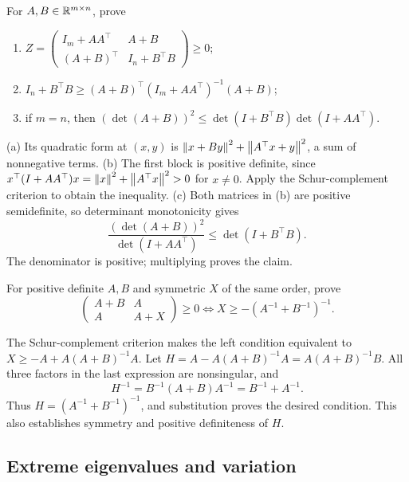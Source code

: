 \begin{problem}\label{ex:12:ineq-ma-37}
For \(A,B\in\mathbb R^{m\times n}\), prove
\begin{enumerate}
\item \(Z=\begin{pmatrix}I_m+AA^\top&A+B\\(A+B)^\top&I_n+B^\top B\end{pmatrix}\geqslant0\);
\item \(I_n+B^\top B\geqslant(A+B)^\top(I_m+AA^\top)^{-1}(A+B)\);
\item if \(m=n\), then
\((\det(A+B))^2\leqslant\det(I+B^\top B)\det(I+AA^\top)\).
\end{enumerate}
\end{problem}
\begin{solution}
(a) Its quadratic form at \((x,y)\) is
\(\left\lVert x+By\right\rVert^2+\left\lVert A^\top x+y\right\rVert^2\), a sum of nonnegative terms.
(b) The first block is positive definite, since
\(x^\top(I+AA^\top)x=\left\lVert x\right\rVert^2+\left\lVert A^\top x\right\rVert^2>0\) for \(x\ne0\).
Apply the Schur-complement criterion to obtain the inequality.
(c) Both matrices in (b) are positive semidefinite, so determinant
monotonicity gives
\[
\frac{(\det(A+B))^2}{\det(I+AA^\top)}
\leqslant\det(I+B^\top B).
\]
The denominator is positive; multiplying proves the claim.
\end{solution}

\begin{problem}\label{ex:12:ineq-ma-38}
For positive definite \(A,B\) and symmetric \(X\) of the same order,
prove
\[
\begin{pmatrix}A+B&A\\A&A+X\end{pmatrix}\geqslant0
\iff X\geqslant-(A^{-1}+B^{-1})^{-1}.
\]
\end{problem}
\begin{solution}
The Schur-complement criterion makes the left condition equivalent to
\(X\geqslant-A+A(A+B)^{-1}A\).
Let \(H=A-A(A+B)^{-1}A=A(A+B)^{-1}B\).
All three factors in the last expression are nonsingular, and
\[
H^{-1}=B^{-1}(A+B)A^{-1}=B^{-1}+A^{-1}.
\]
Thus \(H=(A^{-1}+B^{-1})^{-1}\), and substitution proves the desired
condition. This also establishes symmetry and positive definiteness of \(H\).
\end{solution}

\subsection*{Extreme eigenvalues and variation}

